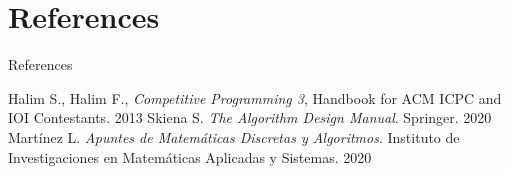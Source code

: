 \documentclass{beamer}
\begin{document}
\section*{References}
\begin{frame}{References}
    \begin{thebibliography}{}
         Halim S., Halim F., \textit{Competitive Programming 3}, Handbook for ACM ICPC and IOI Contestants. 2013
         Skiena S. \textit{The Algorithm Design Manual}. Springer. 2020
         Martínez L. \textit{Apuntes de Matemáticas Discretas y Algoritmos}. Instituto de Investigaciones en Matemáticas Aplicadas y Sistemas. 2020
    \end{thebibliography}
\end{frame}
\end{document}
